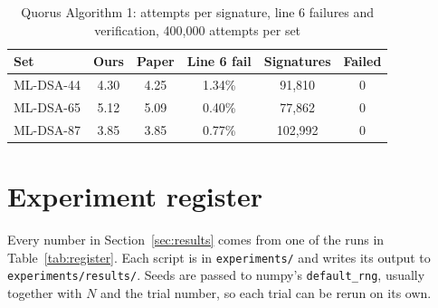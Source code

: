 \documentclass[10pt,conference,a4paper]{IEEEtran}
\begin{document}
\begin{table}[t]
\caption{Quorus Algorithm 1: attempts per signature, line 6 failures and verification, 400{,}000 attempts per set}
\label{tab:quorusrun}
\centering\footnotesize
\begin{tabular}{@{}lccccc@{}}
\toprule
Set & Ours & Paper & Line 6 fail & Signatures & Failed\\
\midrule
ML-DSA-44 & 4.30 & 4.25 & 1.34\% & 91{,}810 & 0\\
ML-DSA-65 & 5.12 & 5.09 & 0.40\% & 77{,}862 & 0\\
ML-DSA-87 & 3.85 & 3.85 & 0.77\% & 102{,}992 & 0\\
\bottomrule
\end{tabular}
\end{table}

\section{Experiment register}\label{app:register}
Every number in Section~\ref{sec:results} comes from one of the runs in Table~\ref{tab:register}. Each script is in
\texttt{experiments/} and writes its output to \texttt{experiments/results/}. Seeds are passed to numpy's
\texttt{default\_rng}, usually together with $N$ and the trial number, so each trial can be rerun on its own.
\end{document}
